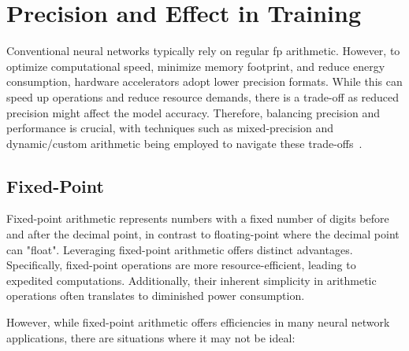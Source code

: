 \section{Precision and Effect in Training}

Conventional neural networks typically rely on regular \gls{fp} arithmetic. However, to optimize computational speed, minimize memory footprint, and reduce energy consumption, hardware accelerators adopt lower precision formats. While this can speed up operations and reduce resource demands, there is a trade-off as reduced precision might affect the model accuracy. Therefore, balancing precision and performance is crucial, with techniques such as mixed-precision and dynamic/custom arithmetic being employed to navigate these trade-offs~\cite{micikevicius2017mixed}.
\subsection{Fixed-Point}

Fixed-point arithmetic represents numbers with a fixed number of digits before and after the decimal point, in contrast to floating-point where the decimal point can "float". Leveraging fixed-point arithmetic offers distinct advantages. Specifically, fixed-point operations are more resource-efficient, leading to expedited computations. Additionally, their inherent simplicity in arithmetic operations often translates to diminished power consumption. 


However, while fixed-point arithmetic offers efficiencies in many neural network applications, there are situations where it may not be ideal:

